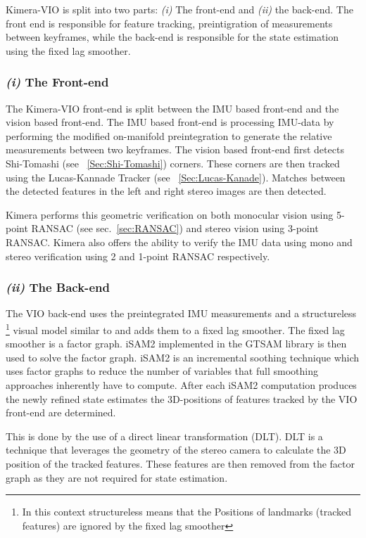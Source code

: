 \documentclass[11pt,a4paper]{article}
\begin{document}
Kimera-VIO is split into two parts: \textit{(i)} The front-end and \textit{(ii)} the back-end. 
The front end is responsible for feature tracking, preintigration of measurements between keyframes, while the back-end is responsible for the state estimation using the fixed lag smoother. 
\subsubsection*{\textit{(i)} The Front-end}\label{para:geometric verification} 

The Kimera-VIO front-end is split between the IMU based front-end and the vision based front-end.
The IMU based front-end is processing IMU-data by performing the modified on-manifold preintegration to generate the relative measurements between two keyframes. 
The vision based front-end first detects Shi-Tomashi (see ~\ref{Sec:Shi-Tomashi}) corners. 
These corners are then tracked using the Lucas-Kannade Tracker \cite{lucas1981iterative} (see ~\ref{Sec:Lucas-Kanade}). 
Matches between the detected features in the left and right stereo images are then detected.  

Kimera performs this geometric verification on both monocular vision using 5-point RANSAC (see sec.~\ref{sec:RANSAC}) and stereo vision using 3-point RANSAC.
Kimera also offers the ability to verify the IMU data using mono and stereo verification using 2 and 1-point RANSAC respectively.

\subsubsection*{\textit{(ii)} The Back-end}
The VIO back-end uses the preintegrated IMU measurements and a structureless \footnote{In this context structureless means that the Positions of landmarks (tracked features) are ignored by the fixed lag smoother} visual model similar to \cite{Forster_2017} and adds them to a fixed lag smoother.
The fixed lag smoother is a factor graph. 
iSAM2 implemented in the GTSAM library is then used to solve the factor graph. 
iSAM2 is an incremental soothing technique which uses factor graphs to reduce the number of variables that full smoothing approaches inherently have to compute. 
After each iSAM2 computation produces the newly refined state estimates the 3D-positions of features tracked by the VIO front-end are determined.

This is done by the use of a direct linear transformation (DLT). 
DLT is a technique that leverages the geometry of the stereo camera to calculate the 3D position of the tracked features.
These features are then removed from the factor graph as they are not required for state estimation.
\end{document}
